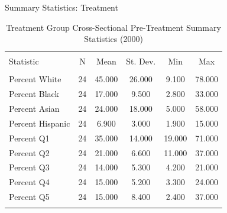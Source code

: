 \documentclass[11pt,ignorenonframetext,]{beamer}
\begin{document}
\begin{frame}{Summary Statistics: Treatment}
\protect\hypertarget{summary-statistics-treatment}{}

\begin{table}[!htbp] \centering 
  \caption{Treatment Group Cross-Sectional Pre-Treatment Summary Statistics (2000)} 
  \label{} 
\begin{tabular}{@{\extracolsep{5pt}}lccccc} 
\\[-1.8ex]\hline \\[-1.8ex] 
Statistic & \multicolumn{1}{c}{N} & \multicolumn{1}{c}{Mean} & \multicolumn{1}{c}{St. Dev.} & \multicolumn{1}{c}{Min} & \multicolumn{1}{c}{Max} \\ 
\hline \\[-1.8ex] 
Percent White & 24 & 45.000 & 26.000 & 9.100 & 78.000 \\ 
Percent Black & 24 & 17.000 & 9.500 & 2.800 & 33.000 \\ 
Percent Asian & 24 & 24.000 & 18.000 & 5.000 & 58.000 \\ 
Percent Hispanic & 24 & 6.900 & 3.000 & 1.900 & 15.000 \\ 
Percent Q1 & 24 & 35.000 & 14.000 & 19.000 & 71.000 \\ 
Percent Q2 & 24 & 21.000 & 6.600 & 11.000 & 37.000 \\ 
Percent Q3 & 24 & 14.000 & 5.300 & 4.200 & 21.000 \\ 
Percent Q4 & 24 & 15.000 & 5.200 & 3.300 & 24.000 \\ 
Percent Q5 & 24 & 15.000 & 8.400 & 2.400 & 37.000 \\ 
\hline \\[-1.8ex] 
\end{tabular} 
\end{table}

\end{frame}
\end{document}
